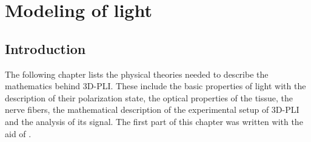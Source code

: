 \cleardoublepage
\setcounter{chapter}{2}
\chapter{Modeling of light}
\label{sec:theory}
%
%
\section{Introduction}
The following chapter lists the physical theories needed to describe the mathematics behind \ac{3D-PLI}.
These include the basic properties of light with the description of their polarization state, the optical properties of the tissue, \ie{} the nerve fibers, the mathematical description of the experimental setup of \ac{3D-PLI} and the analysis of its signal.
The first part of this chapter was written with the aid of \cite{demtroeder2, Fliebach2012}.
%
%
%

